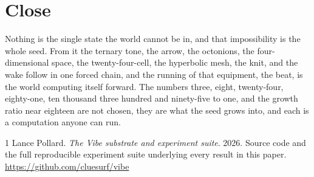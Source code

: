 \documentclass{article}
\begin{document}
\section*{Close}

Nothing is the single state the world cannot be in, and that impossibility is the whole seed. From
it the ternary tone, the arrow, the octonions, the four-dimensional space, the twenty-four-cell,
the hyperbolic mesh, the knit, and the wake follow in one forced chain, and the running of that
equipment, the beat, is the world computing itself forward. The numbers three, eight,
twenty-four, eighty-one, ten thousand three hundred and ninety-five to one, and the growth ratio
near eighteen are not chosen, they are what the seed grows into, and each is a computation anyone
can run.

\begin{thebibliography}{1}
Lance Pollard. \emph{The Vibe substrate and experiment suite}. 2026.
Source code and the full reproducible experiment suite underlying every result in this paper.
\url{https://github.com/cluesurf/vibe}
\end{thebibliography}
\end{document}
